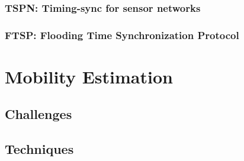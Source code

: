 \subsubsection{TSPN: Timing-sync for sensor networks}
\subsubsection{FTSP: Flooding Time Synchronization Protocol}

\section{Mobility Estimation}
\subsection{Challenges}
\subsection{Techniques}





